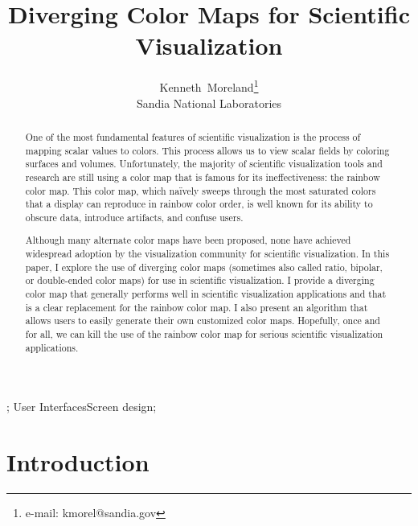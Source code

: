 \documentclass{acmsiggraph}               %
\title{Diverging Color Maps for Scientific Visualization}
\author{Kenneth~Moreland\thanks{e-mail: kmorel@sandia.gov}\\Sandia National Laboratories}
\begin{document}

\maketitle

\begin{abstract}
  One of the most fundamental features of scientific visualization is the
  process of mapping scalar values to colors.  This process allows us to
  view scalar fields by coloring surfaces and volumes.  Unfortunately, the
  majority of scientific visualization tools and research are still using a
  color map that is famous for its ineffectiveness: the rainbow color map.
  This color map, which na\"{i}vely sweeps through the most
  saturated colors that a display can reproduce in rainbow color order, is
  well known for its ability to obscure data, introduce artifacts, and
  confuse users.

  Although many alternate color maps have been proposed, none have achieved
  widespread adoption by the visualization community for scientific
  visualization.  In this paper, I explore the use of diverging color maps
  (sometimes also called ratio, bipolar, or double-ended color maps) for
  use in scientific visualization.  I provide a diverging color map that
  generally performs well in scientific visualization applications and that
  is a clear replacement for the rainbow color map.  I also present an
  algorithm that allows users to easily generate their own customized color
  maps.  Hopefully, once and for all, we can kill the use of the rainbow
  color map for serious scientific visualization applications.
\end{abstract}


\begin{CRcatlist}
  ;
    {User Interfaces}{Screen design};
\end{CRcatlist}

\keywordlist

\section{Introduction}
\label{sec:Introduction}
\end{document}
